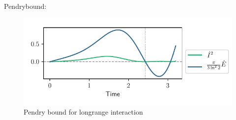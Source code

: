 \documentclass{book}
\numberwithin{equation}{section} %
\begin{document}
Pendrybound:
\begin{figure}[h!]
    \centering
    \includegraphics{alltheplots/longrange/2_pendry_grey_lines.pdf}
    \caption{Pendry bound for longrange interaction}
    \label{fig:long-pendry}
\end{figure}

\printbibliography

\declaration
\end{document}
